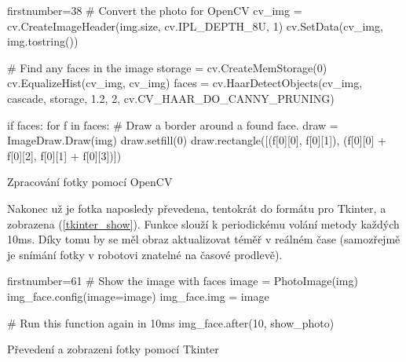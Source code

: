 \begin{listing}
\begin{pyc*}{firstnumber=38}
    # Convert the photo for OpenCV
    cv_img = cv.CreateImageHeader(img.size, cv.IPL_DEPTH_8U, 1)
    cv.SetData(cv_img, img.tostring())

    # Find any faces in the image
    storage = cv.CreateMemStorage(0)
    cv.EqualizeHist(cv_img, cv_img)
    faces = cv.HaarDetectObjects(cv_img, 
                cascade, 
                storage, 
                1.2, 2,
                cv.CV_HAAR_DO_CANNY_PRUNING)

    if faces:
        for f in faces:
            # Draw a border around a found face.
            draw = ImageDraw.Draw(img)
            draw.setfill(0)
            draw.rectangle([(f[0][0],
                             f[0][1]),
                            (f[0][0] + f[0][2],
                             f[0][1] + f[0][3])])
\end{pyc*}
\caption{Zpracování fotky pomocí OpenCV}
\label{opencv_part}
\end{listing}

Nakonec už je fotka naposledy převedena, tentokrát do formátu pro Tkinter, a
zobrazena (\ref{tkinter_show}). Funkce  slouží k periodickému
volání metody  každých 10ms. Díky tomu by se měl obraz
aktualizovat téměř v reálném čase (samozřejmě je snímání fotky v robotovi
znatelné na časové prodlevě).

\begin{listing}
\begin{pyc*}{firstnumber=61}
    # Show the image with faces
    image = PhotoImage(img)
    img_face.config(image=image)
    img_face.img = image

    # Run this function again in 10ms
    img_face.after(10, show_photo)
\end{pyc*}
\caption{Převedení a zobrazeni fotky pomocí Tkinter}
\label{tkinter_show}
\end{listing}

